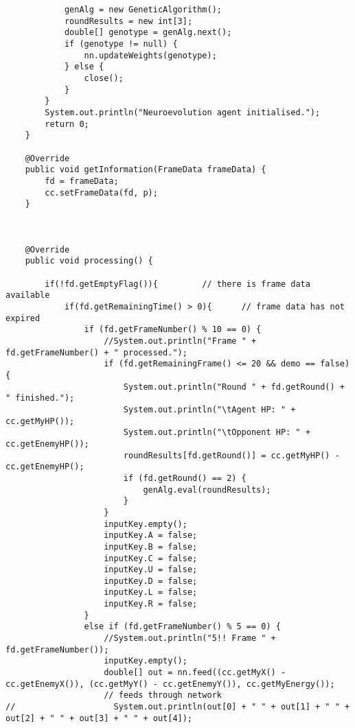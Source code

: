 \documentclass[12pt,a4paper]{article}
\begin{document}
\begin{lstlisting}
            genAlg = new GeneticAlgorithm();
            roundResults = new int[3];
            double[] genotype = genAlg.next();
            if (genotype != null) {
                nn.updateWeights(genotype);
            } else {
                close();
            }
        }
        System.out.println("Neuroevolution agent initialised.");
        return 0;
    }

    @Override
    public void getInformation(FrameData frameData) {
        fd = frameData;
        cc.setFrameData(fd, p);
    }



    @Override
    public void processing() {

        if(!fd.getEmptyFlag()){         // there is frame data available
            if(fd.getRemainingTime() > 0){      // frame data has not expired
                if (fd.getFrameNumber() % 10 == 0) {
                    //System.out.println("Frame " + fd.getFrameNumber() + " processed.");
                    if (fd.getRemainingFrame() <= 20 && demo == false) {
                        System.out.println("Round " + fd.getRound() + " finished.");
                        System.out.println("\tAgent HP: " + cc.getMyHP());
                        System.out.println("\tOpponent HP: " + cc.getEnemyHP());
                        roundResults[fd.getRound()] = cc.getMyHP() - cc.getEnemyHP();
                        if (fd.getRound() == 2) {
                            genAlg.eval(roundResults);
                        }
                    }
                    inputKey.empty();
                    inputKey.A = false;
                    inputKey.B = false;
                    inputKey.C = false;
                    inputKey.U = false;
                    inputKey.D = false;
                    inputKey.L = false;
                    inputKey.R = false;
                }
                else if (fd.getFrameNumber() % 5 == 0) {
                    //System.out.println("5!! Frame " + fd.getFrameNumber());
                    inputKey.empty();
                    double[] out = nn.feed((cc.getMyX() - cc.getEnemyX()), (cc.getMyY() - cc.getEnemyY()), cc.getMyEnergy());
                    // feeds through network
//                    System.out.println(out[0] + " " + out[1] + " " + out[2] + " " + out[3] + " " + out[4]);


\end{lstlisting}
\end{document}
